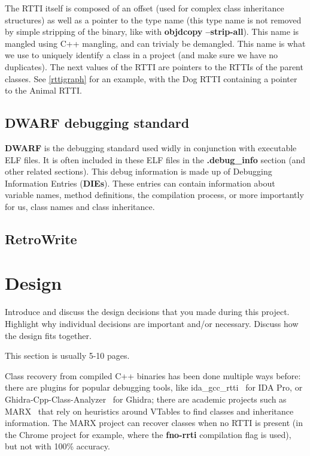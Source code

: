 \documentclass[a4paper,11pt,oneside]{report}
\begin{document}
The RTTI itself is composed of an offset (used for complex class inheritance structures) as well as a pointer to the type name (this type name is not removed by simple stripping of the binary, like with \textbf{objdcopy --strip-all}).
This name is mangled using C++ mangling, and can trivialy be demangled. This name is what we use to uniquely identify a class in a project (and make sure we have no duplicates).
The next values of the RTTI are pointers to the RTTIs of the parent classes. See \autoref{rttigraph} for an example, with the Dog RTTI containing a pointer to the Animal RTTI.

\section{DWARF debugging standard}

\textbf{DWARF} is the debugging standard used widly in conjunction with executable ELF files.
It is often included in these ELF files in the \textbf{.debug\_info} section (and other related sections).
This debug information is made up of Debugging Information Entries (\textbf{DIEs}).
These entries can contain information about variable names, method definitions, the compilation process, or more importantly for us, class names and class inheritance.


\section{RetroWrite}



\chapter{Design}

Introduce and discuss the design decisions that you made during this project.
Highlight why individual decisions are important and/or necessary. Discuss
how the design fits together.

This section is usually 5-10 pages.

Class recovery from compiled C++ binaries has been done multiple ways before:
there are plugins for popular debugging tools, like ida\_gcc\_rtti~\cite{idagccrtti} for IDA Pro,
or Ghidra-Cpp-Class-Analyzer~\cite{ghidracppclassanalyzer} for Ghidra;
there are academic projects such as MARX~\cite{marx} that rely on heuristics around VTables to find classes and inheritance information.
The MARX project can recover classes when no RTTI is present (in the Chrome project for example, where the \textbf{fno-rrti} compilation flag is used), but not with 100\% accuracy.
\end{document}
